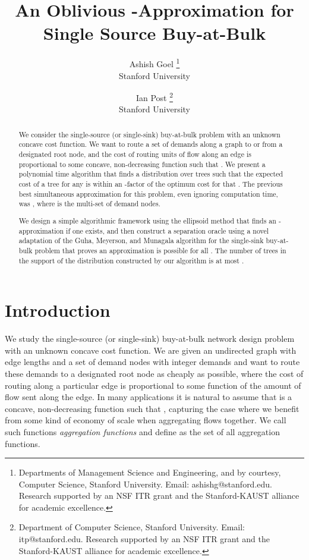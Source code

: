 \documentclass[11pt]{article}
\begin{document}
\title{An Oblivious -Approximation for Single Source
Buy-at-Bulk}
\author{Ashish Goel
\thanks{Departments of Management Science and Engineering, and by courtesy,
Computer Science, Stanford University. Email: ashishg@stanford.edu.
Research supported by an NSF ITR grant and the Stanford-KAUST alliance for academic excellence.}
\\Stanford University
\and Ian Post
\thanks{Department of Computer Science, Stanford University. Email: itp@stanford.edu.
Research supported by an NSF ITR grant and the Stanford-KAUST alliance for academic excellence.}
\\Stanford University}

\maketitle
\thispagestyle{empty}
\begin{abstract}
We consider the single-source (or single-sink) buy-at-bulk problem with an
unknown concave cost function.  We want to route a set of demands along a
graph to or from a designated root node, and the cost of routing  units
of flow along an edge is proportional to some concave, non-decreasing
function  such that .  We present a polynomial time algorithm
that finds a distribution over trees such that the expected cost of a tree
for any  is within an -factor of the optimum cost for that . The
previous best simultaneous approximation for this problem, even ignoring
computation time, was , where  is the
multi-set of demand nodes.

We design a simple algorithmic framework using the ellipsoid method that
finds an -approximation if one exists, and then construct a separation
oracle using a novel adaptation of the Guha, Meyerson, and Munagala
\cite{guha2001cfa} algorithm for the single-sink buy-at-bulk problem that
proves an  approximation is possible for all . The number of trees
in the support of the distribution constructed by our algorithm is at most
.
\end{abstract}
\newpage

\section{Introduction}

We study the single-source (or single-sink) buy-at-bulk network design problem with an unknown concave cost function. 
We are given
an undirected graph  with edge lengths  and a set of
demand nodes  with integer demands  and 
want to route these demands to a
designated root node  as cheaply as possible, where the cost of routing
along a particular edge is proportional to some function  of the amount of
flow sent along the edge. 
In many applications it is natural to assume that
 is a concave, non-decreasing function such that , capturing the
case where we benefit from some kind of economy of scale when aggregating
flows together.  We call such functions \emph{aggregation functions} and
define  as the set of all aggregation functions.
\end{document}
